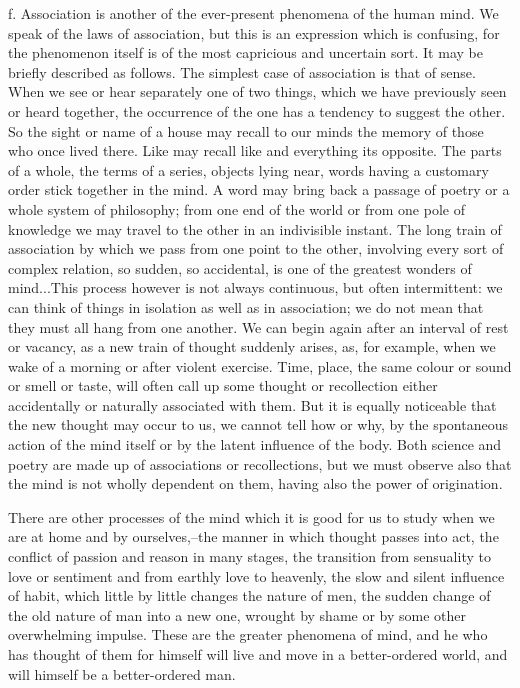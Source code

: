 f. Association is another of the ever-present phenomena of the human
mind. We speak of the laws of association, but this is an expression
which is confusing, for the phenomenon itself is of the most capricious
and uncertain sort. It may be briefly described as follows. The simplest
case of association is that of sense. When we see or hear separately
one of two things, which we have previously seen or heard together, the
occurrence of the one has a tendency to suggest the other. So the sight
or name of a house may recall to our minds the memory of those who once
lived there. Like may recall like and everything its opposite. The parts
of a whole, the terms of a series, objects lying near, words having
a customary order stick together in the mind. A word may bring back a
passage of poetry or a whole system of philosophy; from one end of the
world or from one pole of knowledge we may travel to the other in an
indivisible instant. The long train of association by which we pass from
one point to the other, involving every sort of complex relation, so
sudden, so accidental, is one of the greatest wonders of mind...This
process however is not always continuous, but often intermittent: we can
think of things in isolation as well as in association; we do not mean
that they must all hang from one another. We can begin again after an
interval of rest or vacancy, as a new train of thought suddenly arises,
as, for example, when we wake of a morning or after violent exercise.
Time, place, the same colour or sound or smell or taste, will often
call up some thought or recollection either accidentally or naturally
associated with them. But it is equally noticeable that the new thought
may occur to us, we cannot tell how or why, by the spontaneous action of
the mind itself or by the latent influence of the body. Both science and
poetry are made up of associations or recollections, but we must observe
also that the mind is not wholly dependent on them, having also the
power of origination.

There are other processes of the mind which it is good for us to study
when we are at home and by ourselves,--the manner in which thought
passes into act, the conflict of passion and reason in many stages, the
transition from sensuality to love or sentiment and from earthly love to
heavenly, the slow and silent influence of habit, which little by little
changes the nature of men, the sudden change of the old nature of man
into a new one, wrought by shame or by some other overwhelming impulse.
These are the greater phenomena of mind, and he who has thought of
them for himself will live and move in a better-ordered world, and will
himself be a better-ordered man.

